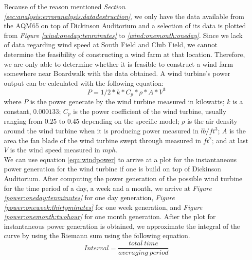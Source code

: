 \documentclass[review]{elsarticle}
\begin{document}
Because of the reason mentioned \textit{Section \ref{sec:analysis:erroranalysis:datadestruction}}, we only have the data available from the AQM65 on top of Dickinson Auditorium and a selection of its data is plotted 
from \textit{Figure \ref{wind:oneday:tenminutes}} to \textit{\ref{wind:onemonth:oneday}}. Since we lack of data regarding wind speed at South Field and Club Field, we cannot determine the feasibility of constructing a 
wind farm at that location. Therefore, we are only able to determine whether it is feasible to construct a wind farm somewhere near Boardwalk with the data obtained. A wind turbine's power output can 
be calculated with the following equation:
\begin{equation}
    \label{equ:windpower}
    P=1/2*k*C_{p}*\rho*A*V^3
\end{equation}
where $P$ is the power generate by the wind turbine measured in kilowatts; $k$ is a constant, $0.000133$; $C_{p}$ is the power coefficient of the wind turbine, usually ranging from $0.25$ to $0.45$ depending on the 
specific model; $\rho$ is the air density around the wind turbine when it is producing power measured in $lb/ft^3$; $A$ is the area the fan blade of the wind turbine swept through measured in $ft^2$; and at last $V$ 
is the wind speed measured in $mph$.
\\\indent We can use equation \ref{equ:windpower} to arrive at a plot for the instantaneous power generation for the wind turbine if one is build on top of Dickinson Auditorium. After computing the power generation 
of the possible wind turbine for the time period of a day, a week and a month, we arrive at \textit{Figure \ref{power:oneday:tenminutes}} for one day generation, \textit{Figure \ref{power:oneweek:thirtyminutes}} for 
one week generation, and \textit{Figure \ref{power:onemonth:twohour}} for one month generation. After the plot for instantaneous power generation is obtained, we approximate the integral of the curve by using 
the Riemann sum using the following equation.
\begin{equation}
    \label{equ:windinterval}
    Interval = \frac{total\ time}{averaging\ period}
\end{equation}
\end{document}

